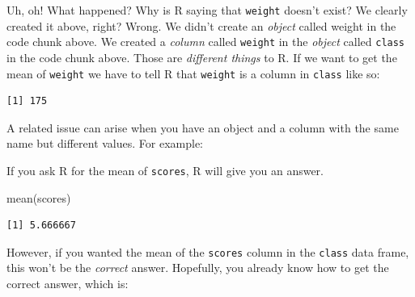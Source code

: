 \documentclass[
  letterpaper,
  DIV=11,
  numbers=noendperiod]{scrreprt}
\newenvironment{Shaded}{\begin{snugshade}}{\end{snugshade}}
\newcommand{\CommentTok}[1]{\textcolor[rgb]{0.37,0.37,0.37}{#1}}
\newcommand{\DecValTok}[1]{\textcolor[rgb]{0.68,0.00,0.00}{#1}}
\newcommand{\FunctionTok}[1]{\textcolor[rgb]{0.28,0.35,0.67}{#1}}
\newcommand{\NormalTok}[1]{\textcolor[rgb]{0.00,0.23,0.31}{#1}}
\newcommand{\OtherTok}[1]{\textcolor[rgb]{0.00,0.23,0.31}{#1}}
\newcommand{\SpecialCharTok}[1]{\textcolor[rgb]{0.37,0.37,0.37}{#1}}
\begin{document}
Uh, oh! What happened? Why is R saying that \texttt{weight} doesn't
exist? We clearly created it above, right? Wrong. We didn't create an
\emph{object} called weight in the code chunk above. We created a
\emph{column} called \texttt{weight} in the \emph{object} called
\texttt{class} in the code chunk above. Those are \emph{different
things} to R. If we want to get the mean of \texttt{weight} we have to
tell R that \texttt{weight} is a column in \texttt{class} like so:

\begin{Shaded}
\end{Shaded}

\begin{verbatim}
[1] 175
\end{verbatim}

A related issue can arise when you have an object and a column with the
same name but different values. For example:

\begin{Shaded}
\end{Shaded}

If you ask R for the mean of \texttt{scores}, R will give you an answer.

\begin{Shaded}
\begin{Highlighting}[]
\FunctionTok{mean}\NormalTok{(scores)}
\end{Highlighting}
\end{Shaded}

\begin{verbatim}
[1] 5.666667
\end{verbatim}

However, if you wanted the mean of the \texttt{scores} column in the
\texttt{class} data frame, this won't be the \emph{correct} answer.
Hopefully, you already know how to get the correct answer, which is:
\end{document}
